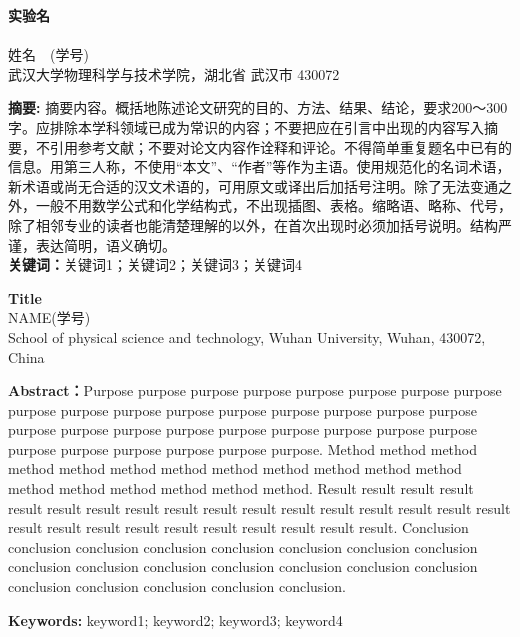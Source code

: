 \documentclass{whureport}
\newcommand{\name}{姓名}
\newcommand{\stuid}{学号}
\newcommand{\Name}{NAME}
\newcommand{\newtitle}{实验名}
\begin{document}
\pagestyle{maincontent} 


\begin{center}
 \textbf{\newtitle}\\
~\\
 \kaishu \name \ \ (\stuid)\\
 \kaishu 武汉大学物理科学与技术学院，湖北省 武汉市 430072\\
\end{center}
\textbf{摘\quad 要:}
摘要内容。概括地陈述论文研究的目的、方法、结果、结论，要求200～300字。应排除本学科领域已成为常识的内容；不要把应在引言中出现的内容写入摘要，不引用参考文献；不要对论文内容作诠释和评论。不得简单重复题名中已有的信息。用第三人称，不使用“本文”、“作者”等作为主语。使用规范化的名词术语，新术语或尚无合适的汉文术语的，可用原文或译出后加括号注明。除了无法变通之外，一般不用数学公式和化学结构式，不出现插图、表格。缩略语、略称、代号，除了相邻专业的读者也能清楚理解的以外，在首次出现时必须加括号说明。结构严谨，表达简明，语义确切。\\
\textbf{关键词：}关键词1；关键词2；关键词3；关键词4
~\\
\begin{center}
	 \textbf{Title}\\
	 \Name\quad (\stuid)\\
	 School of physical science and technology, Wuhan University, Wuhan, 430072, China
\end{center}

\textbf{Abstract：}Purpose purpose purpose purpose purpose purpose purpose purpose purpose purpose purpose purpose purpose purpose purpose purpose purpose purpose purpose purpose purpose purpose purpose purpose purpose purpose purpose purpose purpose purpose purpose purpose. Method method method method method method method method method method method method method method method method method method. Result result result result result result result result result result result result result result result result result result result result result result result result result result result. Conclusion conclusion conclusion conclusion conclusion conclusion conclusion conclusion conclusion conclusion conclusion conclusion conclusion conclusion conclusion conclusion conclusion conclusion conclusion conclusion.

\textbf{Keywords: }keyword1; keyword2; keyword3; keyword4
\end{document}
